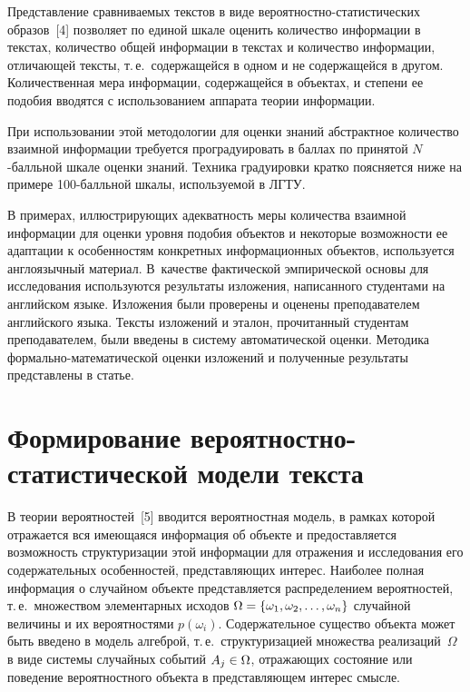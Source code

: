 \begin{multicols}{2}
     Представление сравниваемых текстов в виде 
     ве\-ро\-ят\-ност\-но-ста\-ти\-сти\-че\-ских образов~[4] позволяет по единой 
шкале оценить количество информации в текстах, количество общей информации в 
текстах и количество информации, отличающей тексты, т.\,е.\ содержащейся в 
одном и не содержащейся в другом. Количественная мера информации, 
содержащейся в объектах, и степени ее подобия вводятся с использованием 
аппарата теории информации. 
     
     При использовании этой методологии для оценки знаний абстрактное 
количество взаимной информации требуется проградуировать в баллах по принятой 
$N$-балль\-ной шкале оценки знаний. Техника градуировки кратко поясняется ниже 
на примере 100-балль\-ной шкалы, используемой в ЛГТУ. 
     
     В примерах, иллюстрирующих адекватность меры количества взаимной 
информации для оценки уровня подобия объектов и некоторые возможности ее 
адаптации к особенностям конкретных информационных объектов, используется 
англоязычный материал. В~качестве фактической эмпирической основы для 
исследования используются результаты изложения, написанного студентами на 
английском языке. Изложения были проверены и оценены преподавателем 
английского языка. Тексты изложений и эталон, прочитанный студентам 
преподавателем, были введены в систему автоматической оценки. Методика 
фор\-маль\-но-ма\-те\-ма\-ти\-че\-ской оценки изложений и полученные результаты 
представлены в статье.
     
\section{Формирование вероятностно-статистической модели текста}
     
     В теории вероятностей~[5] вводится вероятностная модель, в рамках которой 
отражается вся имеющаяся информация об объекте и предоставляется возможность 
структуризации этой информации для отражения и исследования его 
содержательных особенностей, представляющих интерес. Наиболее полная 
информация о случайном объекте пред\-став\-ля\-ет\-ся распределением вероятностей, 
т.\,е.\ множеством элементарных исходов $\Omega\hm=\{\omega_1, \omega_2, \ldots , 
\omega_n\}$ случайной величины и их вероятностями $p(\omega_i)$. 
Содержательное существо объекта может быть введено в модель алгеброй, т.\,е.\ 
структуризацией множества реализаций~$\Omega$ в виде системы случайных 
событий $A_j\hm\in \Omega$, отражающих состояние или поведение вероятностного 
объекта в представляющем интерес смысле. 
     

\end{multicols}
